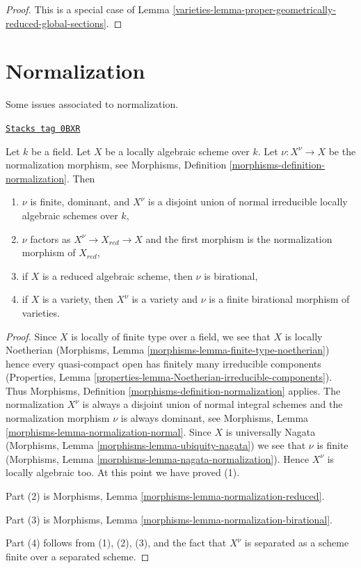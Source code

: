 \begin{proof}

This is a special case of
Lemma \ref{varieties-lemma-proper-geometrically-reduced-global-sections}.
\end{proof}

\section{Normalization}
\label{varieties-section-normalization}
Some issues associated to normalization.

\begin{lemma}
\label{varieties-lemma-normalization-locally-algebraic}
\href{https://stacks.math.columbia.edu/tag/0BXR}{\texttt{Stacks tag 0BXR}}

Let $k$ be a field. Let $X$ be a locally algebraic scheme over $k$.
Let $\nu : X^\nu \to X$ be the normalization morphism, see
Morphisms, Definition \ref{morphisms-definition-normalization}.
Then
\begin{enumerate}
\item $\nu$ is finite, dominant, and $X^\nu$ is a disjoint
union of normal irreducible locally algebraic schemes over $k$,
\item $\nu$ factors as $X^\nu \to X_{red} \to X$ and the first
morphism is the normalization morphism of $X_{red}$,
\item if $X$ is a reduced algebraic scheme, then $\nu$ is
birational,
\item if $X$ is a variety, then $X^\nu$ is a variety and
$\nu$ is a finite birational morphism of varieties.
\end{enumerate}
\end{lemma}

\begin{proof}
Since $X$ is locally of finite type over a field, we see that
$X$ is locally Noetherian
(Morphisms, Lemma \ref{morphisms-lemma-finite-type-noetherian})
hence every quasi-compact open has finitely many irreducible
components (Properties, Lemma
\ref{properties-lemma-Noetherian-irreducible-components}).
Thus Morphisms, Definition \ref{morphisms-definition-normalization} applies.
The normalization $X^\nu$ is always a disjoint union of normal integral
schemes and the normalization morphism $\nu$ is always dominant, see
Morphisms, Lemma \ref{morphisms-lemma-normalization-normal}.
Since $X$ is universally Nagata
(Morphisms, Lemma \ref{morphisms-lemma-ubiquity-nagata})
we see that $\nu$ is finite
(Morphisms, Lemma \ref{morphisms-lemma-nagata-normalization}).
Hence $X^\nu$ is locally algebraic too.
At this point we have proved (1).

\medskip\noindent
Part (2) is Morphisms, Lemma \ref{morphisms-lemma-normalization-reduced}.

\medskip\noindent
Part (3) is Morphisms, Lemma \ref{morphisms-lemma-normalization-birational}.

\medskip\noindent
Part (4) follows from (1), (2), (3), and the fact that $X^\nu$ is
separated as a scheme finite over a separated scheme.
\end{proof}


